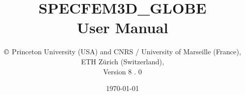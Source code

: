 \documentclass[oneside,english]{book}
\begin{document}

\thispagestyle{empty}
\begin{center}
\vspace*{-1.8truecm}
\noindent{}
\end{center}
%
\title{\thispagestyle{empty}\textbf{SPECFEM3D\_GLOBE}\\
\textbf{User Manual}}
%
\author{$\copyright$ Princeton University (USA) and CNRS / University of Marseille (France),\\
ETH Z\"urich (Switzerland),\\
Version 8 . 0
}

\date{\today}

\maketitle
\end{document}
